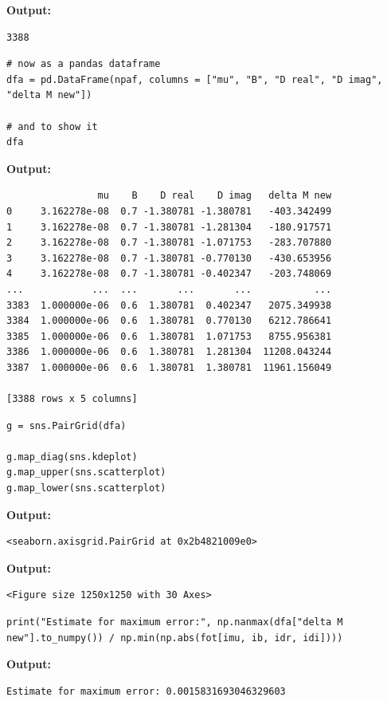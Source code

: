 \documentclass{article}
\begin{document}
\textbf{Output:}\begin{verbatim}
3388

\end{verbatim}

\begin{lstlisting}
# now as a pandas dataframe
dfa = pd.DataFrame(npaf, columns = ["mu", "B", "D real", "D imag", "delta M new"])

# and to show it
dfa\end{lstlisting}

\textbf{Output:}\begin{verbatim}
                mu    B    D real    D imag   delta M new
0     3.162278e-08  0.7 -1.380781 -1.380781   -403.342499
1     3.162278e-08  0.7 -1.380781 -1.281304   -180.917571
2     3.162278e-08  0.7 -1.380781 -1.071753   -283.707880
3     3.162278e-08  0.7 -1.380781 -0.770130   -430.653956
4     3.162278e-08  0.7 -1.380781 -0.402347   -203.748069
...            ...  ...       ...       ...           ...
3383  1.000000e-06  0.6  1.380781  0.402347   2075.349938
3384  1.000000e-06  0.6  1.380781  0.770130   6212.786641
3385  1.000000e-06  0.6  1.380781  1.071753   8755.956381
3386  1.000000e-06  0.6  1.380781  1.281304  11208.043244
3387  1.000000e-06  0.6  1.380781  1.380781  11961.156049

[3388 rows x 5 columns]
\end{verbatim}

\begin{lstlisting}
g = sns.PairGrid(dfa)

g.map_diag(sns.kdeplot)
g.map_upper(sns.scatterplot)
g.map_lower(sns.scatterplot)\end{lstlisting}

\textbf{Output:}\begin{verbatim}
<seaborn.axisgrid.PairGrid at 0x2b4821009e0>
\end{verbatim}

\textbf{Output:}\begin{verbatim}
<Figure size 1250x1250 with 30 Axes>
\end{verbatim}

\begin{lstlisting}
print("Estimate for maximum error:", np.nanmax(dfa["delta M new"].to_numpy()) / np.min(np.abs(fot[imu, ib, idr, idi])))\end{lstlisting}

\textbf{Output:}\begin{verbatim}
Estimate for maximum error: 0.0015831693046329603

\end{verbatim}
\end{document}
